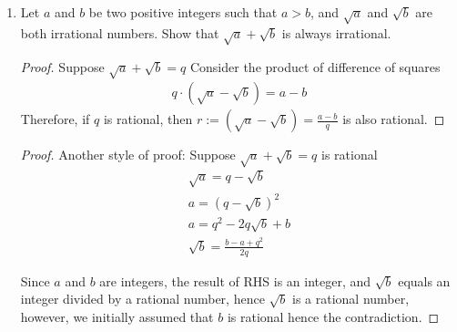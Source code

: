 \documentclass[11pt]{article}
\begin{document}
\begin{enumerate}
    \item Let $a$ and $b$ be two positive integers such that $a > b$, and $\sqrt{a}$ and $\sqrt{b}$ are both irrational numbers. Show that $\sqrt{a} + \sqrt{b}$ is always irrational.
    \begin{proof}
        Suppose $\sqrt{a} + \sqrt{b} = q$ Consider the product of difference of squares
        \begin{gather}
            q \cdot (\sqrt{a} - \sqrt{b}) = a-b
        \end{gather}
        Therefore, if $q$ is rational, then $r:=(\sqrt{a} - \sqrt{b}) = \frac{a-b}{q}$ is also rational.
    \end{proof}
    \begin{proof}
        Another style of proof:
        Suppose $\sqrt{a} + \sqrt{b} = q$ is rational
        \begin{gather}
            \sqrt{a} = q-\sqrt{b} \\
            a = (q - \sqrt{b})^{2} \\
            a = q^{2} - 2q\sqrt{b} + b \\
            \sqrt{b} = \frac{b-a+q^{2}}{2q}
        \end{gather}

        Since $a$ and $b$ are integers, the result of RHS is an integer, and $\sqrt{b}$ equals an integer divided by a rational number, hence $\sqrt{b}$ is a rational number, however, we initially assumed that $b$ is rational hence the contradiction.
    \end{proof}
\end{enumerate}
\end{document}
